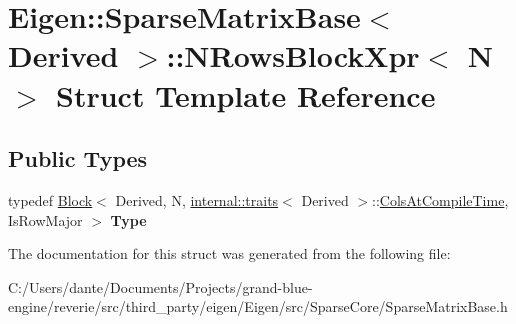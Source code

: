 \hypertarget{struct_eigen_1_1_sparse_matrix_base_1_1_n_rows_block_xpr}{}\section{Eigen\+::Sparse\+Matrix\+Base$<$ Derived $>$\+::N\+Rows\+Block\+Xpr$<$ N $>$ Struct Template Reference}
\label{struct_eigen_1_1_sparse_matrix_base_1_1_n_rows_block_xpr}
\subsection*{Public Types}
\begin{DoxyCompactItemize}
\item 
\mbox{\label{struct_eigen_1_1_sparse_matrix_base_1_1_n_rows_block_xpr_a194047179b454b4bc57182758a3eba39}} 
typedef \mbox{\hyperlink{class_eigen_1_1_block}{Block}}$<$ Derived, N, \mbox{\hyperlink{struct_eigen_1_1internal_1_1traits}{internal\+::traits}}$<$ Derived $>$\+::\mbox{\hyperlink{class_eigen_1_1_sparse_matrix_base_a11b30ed44f64a137b4fa1ee638ca2d36a27ba349f075d026c1f51d1ec69aa5b14}{Cols\+At\+Compile\+Time}}, Is\+Row\+Major $>$ {\bfseries Type}
\end{DoxyCompactItemize}


The documentation for this struct was generated from the following file\+:\begin{DoxyCompactItemize}
\item 
C\+:/\+Users/dante/\+Documents/\+Projects/grand-\/blue-\/engine/reverie/src/third\+\_\+party/eigen/\+Eigen/src/\+Sparse\+Core/Sparse\+Matrix\+Base.\+h\end{DoxyCompactItemize}
